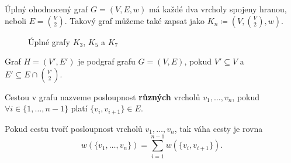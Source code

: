 \begin{definition}
  \label{definice:uplny_ohodnoceny_graf}
  Úplný ohodnocený graf $G = (V, E, w)$ má kaž\-dé dva vrcholy spojeny hranou, neboli $E = \binom{V}{2}$. Takový graf můžeme také zapsat jako $K_n \coloneqq (V,\binom{V}{2},w)$.
  \begin{figure}[h]
    \centering
    \begin{subfigure}[b]{0.3\textwidth}
      \centering
    \end{subfigure}
    \begin{subfigure}[b]{0.3\textwidth}
      \centering
    \end{subfigure}
    \begin{subfigure}[b]{0.3\textwidth}
      \centering
    \end{subfigure}
    \caption{Úplné grafy $K_3$, $K_5$ a $K_7$}
    \label{obr:uplne_ohodnocene_grafy}
  \end{figure}
\end{definition}

\begin{definition}[Podgraf]
  \label{definice:podgraf}
  Graf $H = (V', E')$ je podgraf grafu $G = (V, E)$, pokud $V' \subseteq V$ a $E' \subseteq E \cap \binom{V'}{2}$.
\end{definition}

\begin{definition}[Cesta]
  \label{definice:cesta}
  Cestou v grafu nazveme posloupnost \textbf{různých} vrcholů $v_1, \ldots, v_n$, pokud $\forall i \in \{1,\ldots, n-1\}$ platí $\{v_i, v_{i+1}\} \in E$.
\end{definition}

\begin{definition}
  \label{definice:vaha_cesty}
  Pokud cestu tvoří posloupnost vrcholů $v_1, \ldots, v_n$, tak váha cesty je rovna \[ w(\{v_1,\dots ,v_n\}) = \sum_{i=1}^{n-1}w(\{v_i, v_{i+1}\}). \]

\end{definition}


